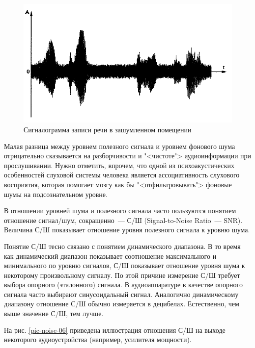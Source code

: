 \documentclass[oneside, final, 14pt]{extreport}
\begin{document}
\begin{figure}[h]
\centering
\includegraphics[scale=0.8]{pic-noise-05}
\caption{Сигналограмма записи речи в зашумленном помещении}
\label{pic-noise-05}
\end{figure}

Малая разница между уровнем полезного сигнала и уровнем фонового шума отрицательно сказывается на разборчивости и "<чистоте"> аудиоинформации при прослушивании. Нужно отметить, впрочем, что одной из психоакустических особенностей слуховой системы человека является ассоциативность слухового восприятия, которая помогает мозгу как бы "<отфильтровывать"> фоновые шумы на подсознательном уровне.

В отношении уровней шума и полезного сигнала часто пользуются понятием отношение сигнал/шум, сокращенно~--- С/Ш (Signal-to-Noise Ratio~--- SNR). Величина С/Ш показывает отношение уровня полезного сигнала к уровню шума.

Понятие С/Ш тесно связано с понятием динамического диапазона. В то время как динамический диапазон показывает соотношение максимального и минимального по уровню сигналов, С/Ш показывает отношение уровня шума к некоторому произвольному сигналу. По этой причине измерение С/Ш требует выбора опорного (эталонного) сигнала. В аудиоаппаратуре в качестве опорного сигнала часто выбирают синусоидальный сигнал. Аналогично динамическому диапазону отношение С/Ш обычно измеряется в децибелах. Естественно, чем выше значение С/Ш, тем лучше.

На рис. \ref{pic-noise-06} приведена иллюстрация отношения С/Ш на выходе некоторого аудиоустройства (например, усилителя мощности).
\end{document}
